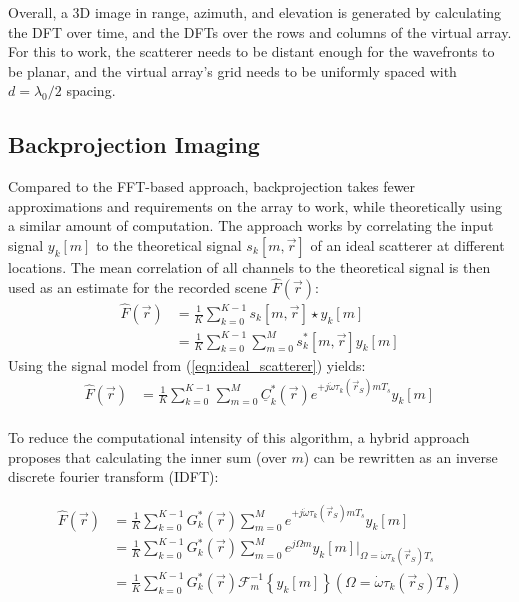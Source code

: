 Overall, a 3D image in range, azimuth, and elevation is generated
by calculating the DFT over time, and the DFTs over the rows and columns of the virtual array.
For this to work, the scatterer needs to be distant enough for the wavefronts to be planar,
and the virtual array's grid needs to be uniformly spaced with $d=\lambda_0/2$ spacing.

\subsection{Backprojection Imaging}
\label{sec:bp_imaging_theory}
Compared to the FFT-based approach, backprojection takes fewer approximations and requirements on the array to work,
while theoretically using a similar amount of computation.
The approach works by correlating the input signal $y_k[m]$
to the theoretical signal $s_k[m, \vec r]$ of an ideal scatterer at different locations.
The mean correlation of all channels to the theoretical signal is then used as an estimate for the recorded scene $\hat F(\vec r)$:
\begin{align}
    \hat F(\vec r) & = \frac{1}{K} \sum_{k=0}^{K-1} s_k[m, \vec r] \star y_k[m]             \\
                   & = \frac{1}{K}\sum_{k=0}^{K-1}\sum_{m=0}^{M} s_k^\ast[m, \vec r] y_k[m]
\end{align}
Using the signal model from (\ref*{eqn:ideal_scatterer}) yields:
\begin{align}
    \hat F(\vec r) & = \frac{1}{K}\sum_{k=0}^{K-1}\sum_{m=0}^{M}
    \underline C_k^\ast(\vec r)e^{+j\dot\omega\tau_k(\vec r_S)mT_s} y_k[m]
\end{align} \\

To reduce the computational intensity of this algorithm,
a hybrid approach\cite{realtime_bp} proposes that
calculating the inner sum (over $m$) can be rewritten as an inverse discrete fourier transform (IDFT):

\begin{align}
    \hat F(\vec r) & = \frac{1}{K}\sum_{k=0}^{K-1}G_k^\ast(\vec r)
    \sum_{m=0}^{M} e^{+j\dot\omega\tau_k(\vec r_S)mT_s} y_k[m]     \\
                   & = \frac{1}{K}\sum_{k=0}^{K-1}G_k^\ast(\vec r)
    \sum_{m=0}^{M} e^{j\Omega m} y_k[m]
    \Big|_{\Omega=\dot\omega\tau_k(\vec r_S)T_s}                   \\
                   & = \frac{1}{K}\sum_{k=0}^{K-1}G_k^\ast(\vec r)
    \mathcal{F}_m^{-1} \left\{ y_k[m]\right\}(\Omega=\dot\omega\tau_k(\vec r_S)T_s)
\end{align}

